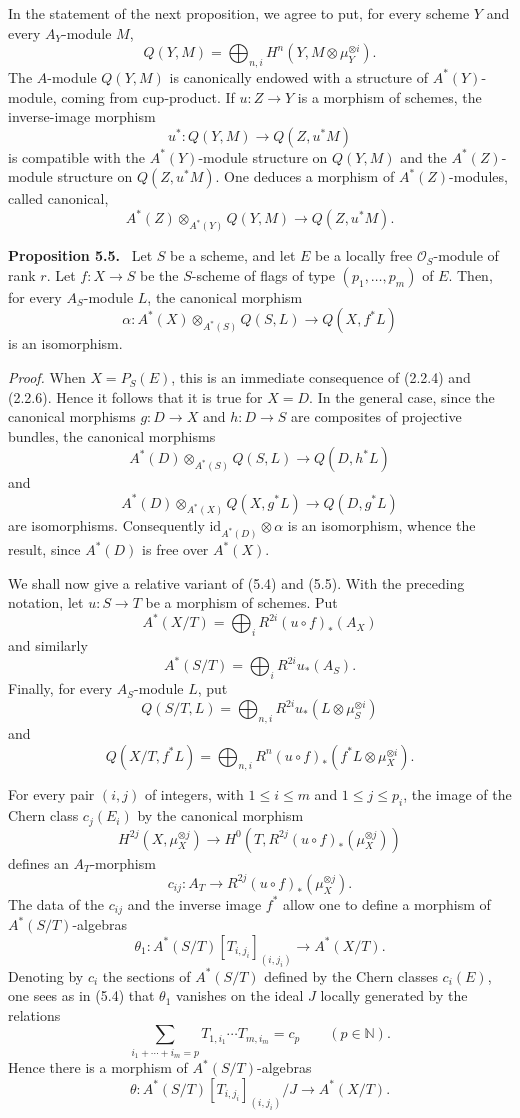 \documentclass[11pt]{article}
\newenvironment{statement}[1]{\par\medskip\noindent\textbf{#1.}\ }{\par\medskip}
\begin{document}
In the statement of the next proposition, we agree to put, for every scheme $Y$ and every $A_Y$-module $M$,
\[
Q(Y,M)=\bigoplus_{n,i}H^n(Y,M\otimes\mu_Y^{\otimes i}).
\]
The $A$-module $Q(Y,M)$ is canonically endowed with a structure of $A^*(Y)$-module, coming from cup-product. If $u:Z\to Y$ is a morphism of schemes, the inverse-image morphism
\[
u^*:Q(Y,M)\to Q(Z,u^*M)
\]
is compatible with the $A^*(Y)$-module structure on $Q(Y,M)$ and the $A^*(Z)$-module structure on $Q(Z,u^*M)$. One deduces a morphism of $A^*(Z)$-modules, called canonical,
\[
A^*(Z)\otimes_{A^*(Y)}Q(Y,M)\to Q(Z,u^*M).
\]

\begin{statement}{Proposition 5.5}
Let $S$ be a scheme, and let $E$ be a locally free $\mathcal O_S$-module of rank $r$. Let $f:X\to S$ be the $S$-scheme of flags of type $(p_1,\ldots,p_m)$ of $E$. Then, for every $A_S$-module $L$, the canonical morphism
\[
\alpha:A^*(X)\otimes_{A^*(S)}Q(S,L)\to Q(X,f^*L)
\]
is an isomorphism.
\end{statement}

\emph{Proof.} When $X=P_S(E)$, this is an immediate consequence of (2.2.4) and (2.2.6). Hence it follows that it is true for $X=D$. In the general case, since the canonical morphisms $g:D\to X$ and $h:D\to S$ are composites of projective bundles, the canonical morphisms
\[
A^*(D)\otimes_{A^*(S)}Q(S,L)\to Q(D,h^*L)
\]
and
\[
A^*(D)\otimes_{A^*(X)}Q(X,g^*L)\to Q(D,g^*L)
\]
are isomorphisms. Consequently $\mathrm{id}_{A^*(D)}\otimes\alpha$ is an isomorphism, whence the result, since $A^*(D)$ is free over $A^*(X)$.

We shall now give a relative variant of (5.4) and (5.5). With the preceding notation, let $u:S\to T$ be a morphism of schemes. Put
\[
A^*(X/T)=\bigoplus_i R^{2i}(u\circ f)_*(A_X)
\]
and similarly
\[
A^*(S/T)=\bigoplus_i R^{2i}u_*(A_S).
\]
Finally, for every $A_S$-module $L$, put
\[
Q(S/T,L)=\bigoplus_{n,i}R^{2i}u_*(L\otimes\mu_S^{\otimes i})
\]
and
\[
Q(X/T,f^*L)=\bigoplus_{n,i}R^n(u\circ f)_*(f^*L\otimes\mu_X^{\otimes i}).
\]

For every pair $(i,j)$ of integers, with $1\le i\le m$ and $1\le j\le p_i$, the image of the Chern class $c_j(E_i)$ by the canonical morphism
\[
H^{2j}(X,\mu_X^{\otimes j})
\to H^0(T,R^{2j}(u\circ f)_*(\mu_X^{\otimes j}))
\]
defines an $A_T$-morphism
\[
c_{ij}:A_T\to R^{2j}(u\circ f)_*(\mu_X^{\otimes j}).
\]
The data of the $c_{ij}$ and the inverse image $f^*$ allow one to define a morphism of $A^*(S/T)$-algebras
\[
\theta_1:A^*(S/T)[T_{i,j_i}]_{(i,j_i)}\to A^*(X/T).
\]
Denoting by $c_i$ the sections of $A^*(S/T)$ defined by the Chern classes $c_i(E)$, one sees as in (5.4) that $\theta_1$ vanishes on the ideal $J$ locally generated by the relations
\[
\sum_{i_1+\cdots+i_m=p}T_{1,i_1}\cdots T_{m,i_m}=c_p\qquad(p\in\mathbb N).
\]
Hence there is a morphism of $A^*(S/T)$-algebras
\[
\theta:A^*(S/T)[T_{i,j_i}]_{(i,j_i)}/J\to A^*(X/T).
\]
\end{document}
